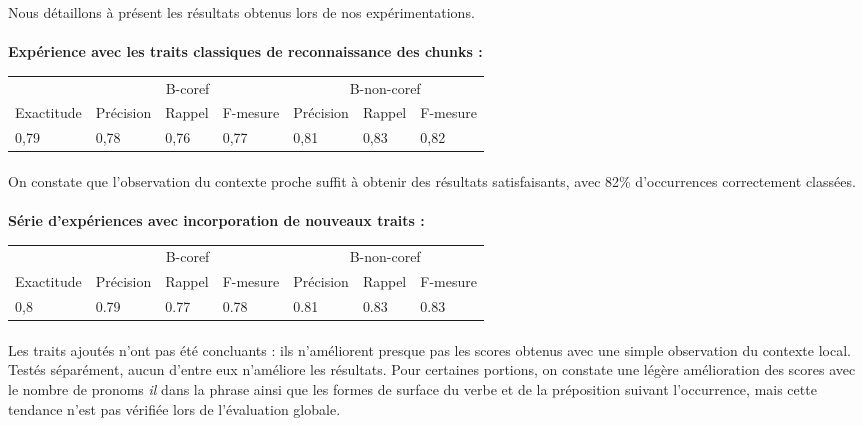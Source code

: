 \documentclass[a4paper,12pt]{article}
\begin{document}
Nous détaillons à présent les résultats obtenus lors de nos expérimentations.

\paragraph{}
\textbf{Expérience avec les traits classiques de reconnaissance des chunks :}

\begin{tabular}[H]{l|lll|lll}
& \multicolumn{3}{c|}{B-coref} & \multicolumn{3}{c}{B-non-coref}\\
Exactitude & Précision & Rappel & F-mesure & Précision & Rappel & F-mesure\\
\hline
0,79 & 0,78 & 0,76 & 0,77 & 0,81 & 0,83 & 0,82\\
\hline
\end{tabular}

\paragraph{}
On constate que l'observation du contexte proche suffit à obtenir des résultats satisfaisants, avec 82\% d'occurrences correctement classées.

\paragraph{}
\textbf{Série d'expériences avec incorporation de nouveaux traits :}

\begin{tabular}[H]{l|lll|lll}
& \multicolumn{3}{c|}{B-coref} & \multicolumn{3}{c}{B-non-coref}\\
Exactitude & Précision & Rappel & F-mesure & Précision & Rappel & F-mesure\\
\hline
0,8 & 0.79 & 0.77 & 0.78 & 0.81 & 0.83 & 0.83\\
\hline
\end{tabular}

\paragraph{}
Les traits ajoutés n'ont pas été concluants : ils n'améliorent presque pas les scores obtenus avec une simple observation du contexte local. Testés séparément, aucun d'entre eux n'améliore les résultats. Pour certaines portions, on constate une légère amélioration des scores avec le nombre de pronoms \og \textit{il} \fg{} dans la phrase ainsi que les formes de surface du verbe et de la préposition suivant l'occurrence, mais cette tendance n'est pas vérifiée lors de l'évaluation globale.
\end{document}
